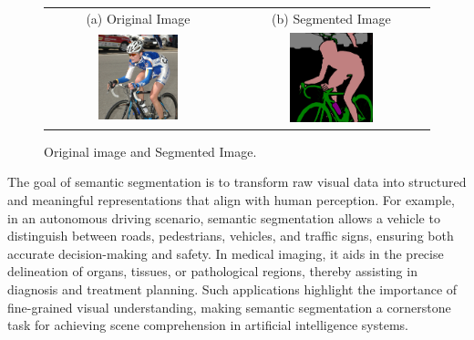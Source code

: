 \begin{figure}[htbp]
    \centering
    \setlength{\tabcolsep}{2pt} %
    \renewcommand{\arraystretch}{0.9}
        \begin{minipage}{0.8\textwidth}
            \centering
            \begin{tabular}{c c} %

            (a) Original Image & (b) Segmented Image \\
            [1mm]
            \includegraphics[width=0.45\textwidth,height=0.45\textwidth]{figures/originals/2011_002135.jpg}
            & 
            \includegraphics[width=0.45\textwidth,height=0.45\textwidth]{figures/colored_gts/2011_002135.png}
            \\
            \end{tabular}
        \end{minipage}
    \caption{Original image and Segmented Image.}
    \label{fig:semantic_segmentation_example}
\end{figure}

The goal of semantic segmentation is to transform raw visual data into structured and meaningful representations that align with human perception. For example, in an autonomous driving scenario, semantic segmentation allows a vehicle to distinguish between roads, pedestrians, vehicles, and traffic signs, ensuring both accurate decision-making and safety. In medical imaging, it aids in the precise delineation of organs, tissues, or pathological regions, thereby assisting in diagnosis and treatment planning. Such applications highlight the importance of fine-grained visual understanding, making semantic segmentation a cornerstone task for achieving scene comprehension in artificial intelligence systems.

